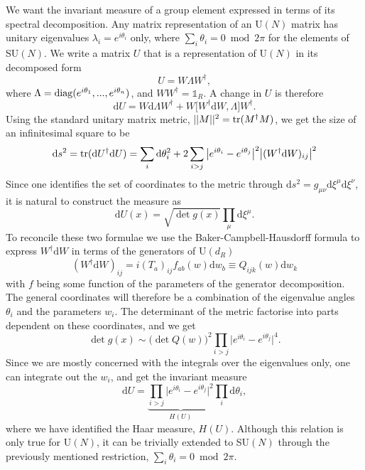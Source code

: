 We want the invariant measure of a group element expressed in terms of its
spectral decomposition. Any matrix representation of an U$(N)$ matrix has
unitary eigenvalues $\lambda_i = e^{i\theta_i}$ only, where $\sum_i \theta_i =
0 \bmod 2\pi$ for the elements of SU$(N)$. We write a matrix $U$ that is a representation
of U$(N)$ in its decomposed form
%
\begin{equation}
  U = W \Lambda W^{\dagger},
\end{equation}
%
where $\Lambda = \operatorname{diag} (e^{i\theta_1}, ..., e^{i\theta_n})$, and $W W^{\dagger}
= \mathbb{1}_R$.  A change in $U$ is therefore
%
\begin{equation}
  \mathrm{d}U = W \mathrm{d} \Lambda W^{\dagger} +  W \big[ W^{\dagger} \mathrm{d}
  W, \Lambda \big] W^{\dagger}.
\end{equation}
%
Using the standard unitary matrix metric, $||M||^2 = \operatorname{tr}(M^{\dagger} M)$, we get
the size of an infinitesimal square to be
%
\begin{equation} \label{eq:infinitesimal-group-square}
  \mathrm{d} s^2 = \operatorname{tr} (\mathrm{d} U^{\dagger} \mathrm{d} U)
  = \sum_i \mathrm{d} \theta_i^2 + 2 \sum_{i > j}
    \big|e^{i \theta_i} - e^{i\theta_j}\big|^2
    \big| (W^{\dagger} \mathrm{d} W)_{ij} \big|^2
\end{equation}
%
Since one identifies the set of coordinates to the metric through
$\mathrm{d} s^2 = g_{\mu\nu} \mathrm{d} \xi^{\mu} \mathrm{d} \xi^{\nu}$,
it is natural to construct the measure as
%
\begin{equation} \label{eq:natural-group-measure}
  \mathrm{d} U(x) = \sqrt{\det g(x)} \prod_{\mu} \mathrm{d}\xi^{\mu}.
\end{equation}
%
To reconcile these two formulae we use the Baker-Campbell-Hausdorff formula to
express $W^{\dagger} \mathrm{d} W$ in terms of the generators of U$(d_R)$
%
\begin{equation}
  (W^{\dagger} \mathrm{d} W)_{ij} = i (T_a)_{ij} f_{a b}(w) \mathrm{d} w_b
  \equiv Q_{ijk}(w) \mathrm{d} w_k
\end{equation}
%
with $f$ being some function of the parameters of the generator decomposition.
The general coordinates will therefore be a combination of the eigenvalue angles
$\theta_i$ and the parameters $w_i$. The determinant of the metric factorise
into parts dependent on these coordinates, and we get
%
\begin{equation}
  \det g(x) \sim \big(\det Q(w)\big)^2 \prod_{i>j} \big|e^{i\theta_i} -
  e^{i\theta_j}\big|^4.
\end{equation}
%
Since we are mostly concerned with the integrals over the eigenvalues only, one
can integrate out the $w_i$, and get the invariant measure
%
\begin{equation}
  \mathrm{d} U = \underbrace{\prod_{i>j} \big| e^{i\theta_i} - e^{i\theta_j} \big|^2}_{H(U)} \prod_i
  \mathrm{d} \theta_i,
\end{equation}
%
where we have identified the Haar measure, $H(U)$. Although this relation is
only true for U$(N)$, it can be trivially extended to SU$(N)$ through the
previously mentioned restriction, $\sum_i \theta_i = 0 \bmod 2\pi$.

